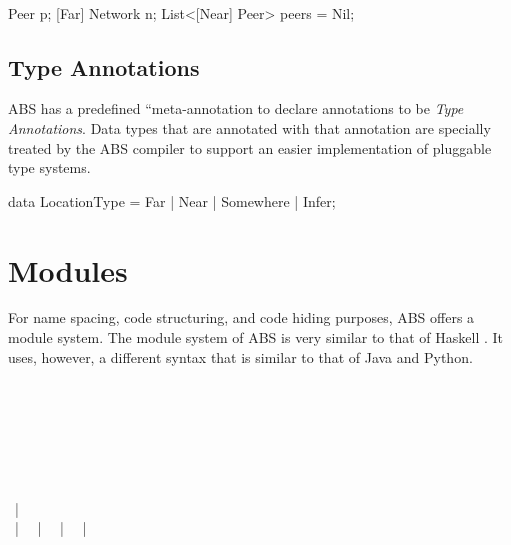 \begin{abssyntax}
  \TRS{[}\ \ \ \TRS{]}
\end{abssyntax}

\begin{absexample}
 Peer p;
[Far] Network n;
List<[Near] Peer> peers = Nil;
\end{absexample}

\subsection{Type Annotations}
ABS has a predefined ``meta-annotation  to declare annotations to be \emph{Type Annotations}.
Data types that are annotated with that annotation are specially treated by the ABS compiler to support an easier implementation of pluggable type systems.

\begin{absexample}
[TypeAnnotation]
data LocationType = Far | Near | Somewhere | Infer;
\end{absexample}


\section{Modules}\label{sec:modules}
For name spacing, code structuring, and code hiding purposes, ABS offers a module system.
The module system of ABS is very similar to that of Haskell \cite{Haskell98}.
It uses, however, a different syntax that is similar to that of Java \cite{gosling96} and Python.
\newpage

\begin{abssyntax}
   {}\ \ \TRS{;}\ \ \ \ \\
   {}\ \\
   {}\ \\
       {}\ \ \ \TRS{;}
             {}\ \TRS{*}\ \ \TRS{;}\\
       {}\ \ \ \TRS{;}
             {}\ \TRS{*}\ \ \ \TRS{;}\\
  {}\ \\
      {} ~|~ \\
         {} ~|~  ~|~ 
                 ~|~  ~|~ 
\end{abssyntax}


